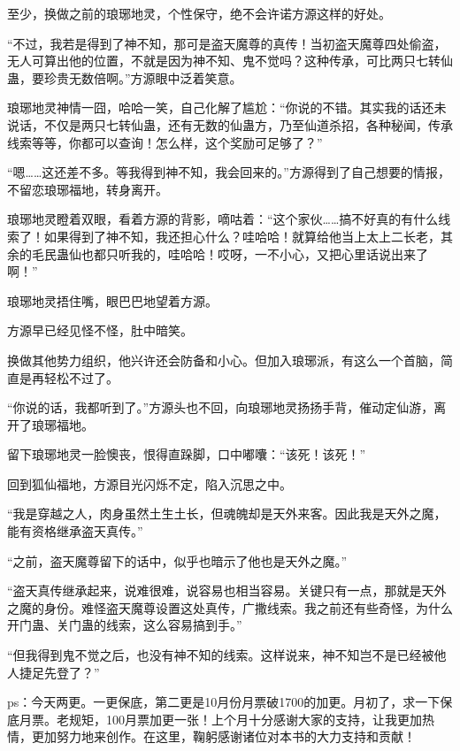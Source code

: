 \begin{this_body}
至少，换做之前的琅琊地灵，个性保守，绝不会许诺方源这样的好处。

“不过，我若是得到了神不知，那可是盗天魔尊的真传！当初盗天魔尊四处偷盗，无人可算出他的位置，不就是因为神不知、鬼不觉吗？这种传承，可比两只七转仙蛊，要珍贵无数倍啊。”方源眼中泛着笑意。

琅琊地灵神情一囧，哈哈一笑，自己化解了尴尬：“你说的不错。其实我的话还未说话，不仅是两只七转仙蛊，还有无数的仙蛊方，乃至仙道杀招，各种秘闻，传承线索等等，你都可以查询！怎么样，这个奖励可足够了？”

“嗯……这还差不多。等我得到神不知，我会回来的。”方源得到了自己想要的情报，不留恋琅琊福地，转身离开。

琅琊地灵瞪着双眼，看着方源的背影，嘀咕着：“这个家伙……搞不好真的有什么线索了！如果得到了神不知，我还担心什么？哇哈哈！就算给他当上太上二长老，其余的毛民蛊仙也都只听我的，哇哈哈！哎呀，一不小心，又把心里话说出来了啊！”

琅琊地灵捂住嘴，眼巴巴地望着方源。

方源早已经见怪不怪，肚中暗笑。

换做其他势力组织，他兴许还会防备和小心。但加入琅琊派，有这么一个首脑，简直是再轻松不过了。

“你说的话，我都听到了。”方源头也不回，向琅琊地灵扬扬手背，催动定仙游，离开了琅琊福地。

留下琅琊地灵一脸懊丧，恨得直跺脚，口中嘟囔：“该死！该死！”

回到狐仙福地，方源目光闪烁不定，陷入沉思之中。

“我是穿越之人，肉身虽然土生土长，但魂魄却是天外来客。因此我是天外之魔，能有资格继承盗天真传。”

“之前，盗天魔尊留下的话中，似乎也暗示了他也是天外之魔。”

“盗天真传继承起来，说难很难，说容易也相当容易。关键只有一点，那就是天外之魔的身份。难怪盗天魔尊设置这处真传，广撒线索。我之前还有些奇怪，为什么开门蛊、关门蛊的线索，这么容易搞到手。”

“但我得到鬼不觉之后，也没有神不知的线索。这样说来，神不知岂不是已经被他人捷足先登了？”

ps：今天两更。一更保底，第二更是10月份月票破1700的加更。月初了，求一下保底月票。老规矩，100月票加更一张！上个月十分感谢大家的支持，让我更加热情，更加努力地来创作。在这里，鞠躬感谢诸位对本书的大力支持和贡献！

\end{this_body}

